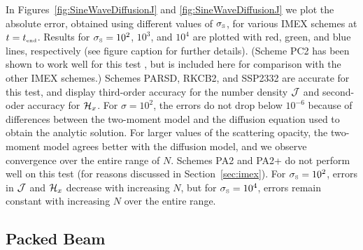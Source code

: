 In Figures~\ref{fig:SineWaveDiffusionJ} and \ref{fig:SineWaveDiffusionJ} we plot the absolute error, obtained using different values of $\sigma_{\mbox{\tiny S}}$, for various IMEX schemes at $t=t_{\mbox{\tiny end}}$.  
Results for $\sigma_{\mbox{\tiny S}}=10^{2}$, $10^{3}$, and $10^{4}$ are plotted with red, green, and blue lines, respectively (see figure caption for further details).  
(Scheme PC2 has been shown to work well for this test \cite{radice_etal_2013}, but is included here for comparison with the other IMEX schemes.)
Schemes PARSD, RKCB2, and SSP2332 are accurate for this test, and display third-order accuracy for the number density $\mathcal{J}$ and second-oder accuracy for $\mathcal{H}_{x}$.  
For $\sigma=10^{2}$, the errors do not drop below $10^{-6}$ because of differences between the two-moment model and the diffusion equation used to obtain the analytic solution.  
For larger values of the scattering opacity, the two-moment model agrees better with the diffusion model, and we observe convergence over the entire range of $N$.  
Schemes PA2 and PA2+ do not perform well on this test (for reasons discussed in Section~\ref{sec:imex}).  
For $\sigma_{\mbox{\tiny S}}=10^{2}$, errors in $\mathcal{J}$ and $\mathcal{H}_{x}$ decrease with increasing $N$, but for $\sigma_{\mbox{\tiny S}}=10^{4}$, errors remain constant with increasing $N$ over the entire range.  

\subsection{Packed Beam}

